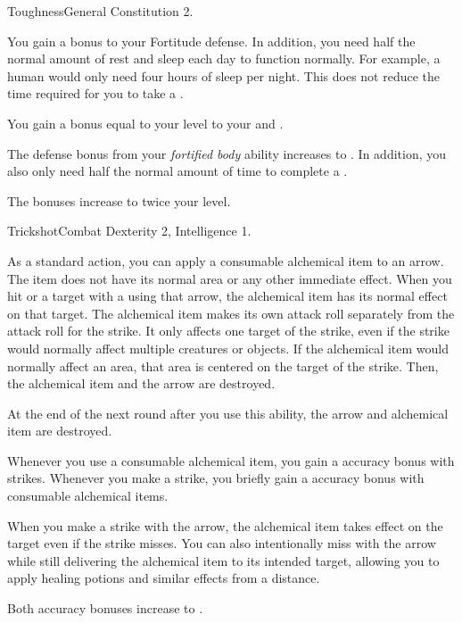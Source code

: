     \begin{feat}{Toughness}{General}
        \featpre Constitution 2.

         You gain a  bonus to your Fortitude defense.
        In addition, you need half the normal amount of rest and sleep each day to function normally.
        For example, a human would only need four hours of sleep per night.
        This does not reduce the time required for you to take a .

         You gain a bonus equal to your level to your  and .

         The defense bonus from your \textit{fortified body} ability increases to .
        In addition, you also only need half the normal amount of time to complete a .

         The bonuses increase to twice your level.
    \end{feat}

    \begin{feat}{Trickshot}{Combat}
        \featpre Dexterity 2, Intelligence 1.

         As a standard action, you can apply a consumable alchemical item to an arrow.
        The item does not have its normal area or any other immediate effect.
        When you hit or  a target with a  using that arrow, the alchemical item has its normal effect on that target.
        The alchemical item makes its own attack roll separately from the attack roll for the strike.
        It only affects one target of the strike, even if the strike would normally affect multiple creatures or objects.
        If the alchemical item would normally affect an area, that area is centered on the target of the strike.
        Then, the alchemical item and the arrow are destroyed.

        At the end of the next round after you use this ability, the arrow and alchemical item are destroyed.

         Whenever you use a consumable alchemical item, you  gain a  accuracy bonus with strikes.
        Whenever you make a strike, you briefly gain a  accuracy bonus with consumable alchemical items.

         When you make a strike with the arrow, the alchemical item takes effect on the target even if the strike misses.
        You can also intentionally miss with the arrow while still delivering the alchemical item to its intended target, allowing you to apply healing potions and similar effects from a distance.

         Both accuracy bonuses increase to .
    \end{feat}

